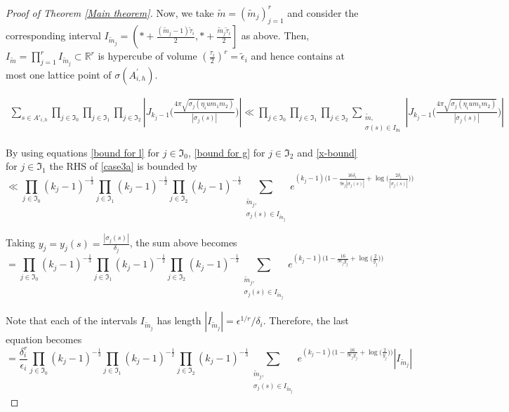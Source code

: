 \documentclass[reqno]{amsart}
\theoremstyle{plain}
\theoremstyle{definition}
\theoremstyle{remark}
\def\R{\mathbb R}
\def\R{\mathbb R}
\def\log{\operatorname{log}}
\begin{document}
\begin{proof}[Proof of Theorem \ref{Main theorem}]
Now, we take $\tilde m = (\tilde m_j)_{j=1}^r$ and consider the corresponding interval $I_{\tilde m_j} =  \left( * + \frac{(\tilde m_j - 1) \tilde \tau_i}{2}, * + \frac{\tilde m_j \tilde \tau_i}{2} \right]$ as above. Then, $I_{\tilde m} = \prod_{j=1}^r I_{\tilde m_j} \subset \R^r$ is hypercube of volume $\left( \frac{\tau_i}{2} \right)^r = \tilde \epsilon_i $ and hence contains at most one lattice point of $\sigma (A^\prime_{i,h})$.


\begin{align}\label{case3a}
\sum_{s\in A'_{i,h} }    \prod_{j\in \mathfrak{I}_0} \prod_{j\in \mathfrak{I}_1} \prod_{j\in \mathfrak{I}_2} \left| J_{k_j-1} \Big(  \frac{4 \pi\sqrt{\sigma_j (\eta_i u m_1m_2 )}}{|\sigma_j(s)|}\Big)\right| \ll \prod_{j \in \mathfrak{I}_0} \prod_{j \in \mathfrak{I}_1} \prod_{j \in \mathfrak{I}_2} \sum_{\substack{\tilde m, \\ \sigma(s) \in I_{\tilde m}}} \left| J_{k_j-1} \Big(  \frac{4 \pi\sqrt{\sigma_j (\eta_i u m_1m_2 )}}{|\sigma_j(s)|}\Big)\right|
\end{align}



By using equations \eqref{bound for l} for $j \in \mathfrak{I}_0$, \eqref{bound for g} for $ j \in \mathfrak{I}_2$ and \eqref{x-bound} for $j \in \mathfrak{I}_1$ the RHS of  \eqref{case3a} is bounded by
\begin{equation}
\ll \prod_{j \in \mathfrak{I}_0} (k_j - 1)^{-\frac{1}{3}} \prod_{j \in \mathfrak{I}_1} (k_j - 1)^{-\frac{1}{2}} \prod_{j \in \mathfrak{I}_2} (k_j - 1)^{-\frac{1}{3}} \sum_{\substack{\tilde m_j, \\ \sigma_j (s) \in I_{\tilde m_j}}}  e^{(k_{j}-1)\Bigg(1-\frac{16\delta_i}{9\epsilon_{j} |\sigma_{j}(s )|}+\log\Big(\frac{2\delta_i}{|\sigma_{j} (s )|}\Big)\Bigg)}
\end{equation}

Taking $y_{j}= y_j (s) = \frac{|\sigma_{j} (s)|}{\delta_j}$, the sum above becomes 
\begin{equation}
= \prod_{j \in \mathfrak{I}_0} (k_j - 1)^{-\frac{1}{3}} \prod_{j \in \mathfrak{I}_1} (k_j - 1)^{-\frac{1}{2}} \prod_{j \in \mathfrak{I}_2} (k_j - 1)^{-\frac{1}{3}} \sum_{\substack{\tilde m_j, \\ \sigma_j (s) \in I_{\tilde m_j}}} e^{(k_{j}-1)\Bigg(1-\frac{16}{9\epsilon_{j} y_j}+\log\Big(\frac{2}{y_j}\Big)\Bigg)}
\end{equation}


Note that each of the intervals $I_{\tilde m_j}$ has length $|I_{\tilde m_j}| = \epsilon^{1/r}/\delta_i$. Therefore, the last equation becomes
\begin{equation}
= \frac{\delta_i^r}{\epsilon_i} \prod_{j \in \mathfrak{I}_0} (k_j - 1)^{-\frac{1}{3}} \prod_{j \in \mathfrak{I}_1} (k_j - 1)^{-\frac{1}{2}} \prod_{j \in \mathfrak{I}_2} (k_j - 1)^{-\frac{1}{3}} \sum_{\substack{\tilde m_j, \\ \sigma_j (s) \in I_{\tilde m_j}}}  e^{(k_{j}-1)\Bigg(1-\frac{16}{9\epsilon_{j} y_j}+\log\Big(\frac{2}{y_j}\Big)\Bigg)} |I_{\tilde m_j}|
\end{equation}



\end{proof}
\end{document}
